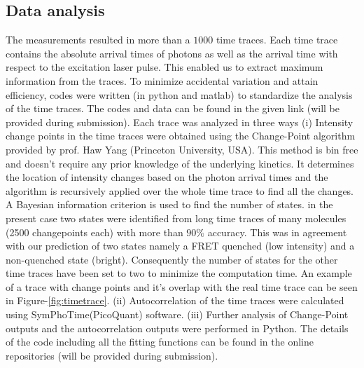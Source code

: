 \documentclass[journal=jacsat,manuscript=article]{achemso}
\begin{document}
\subsection{Data analysis}
The measurements resulted in more than a $1000$ time traces. Each time trace contains the absolute arrival times of photons as well as the arrival time with respect to the excitation laser pulse. This enabled us to extract maximum information from the traces. To minimize accidental variation and attain efficiency, codes were written (in python and matlab) to standardize the analysis of the time traces. The codes and data can be found in the given link (will be provided during submission). Each trace was analyzed in three ways (i) Intensity change points in the time traces were obtained using the Change-Point algorithm\cite{watkins2005detection} provided by prof. Haw Yang (Princeton University, USA). This method is bin free and doesn't require any prior knowledge of the underlying kinetics. It determines the location of intensity changes based on the photon arrival times and the algorithm is recursively applied over the whole time trace to find all the changes. A Bayesian information criterion is used to find the number of states. in the present case two states were identified from long time traces of many molecules (2500 changepoints each) with more than $90\%$ accuracy. This was in agreement with our prediction of two states namely a FRET quenched (low intensity) and a non-quenched state (bright). Consequently the number of states for the other time traces have been set to two to minimize the computation time. An example of a trace with change points and it's overlap with the real time trace can be seen in Figure-\ref{fig:timetrace}. (ii) Autocorrelation of the time traces were calculated using SymPhoTime(PicoQuant) software. (iii) Further analysis of Change-Point outputs and the autocorrelation outputs were performed in Python. The details of the code including all the fitting functions can be found in the online repositories (will be provided during submission).
\end{document}
